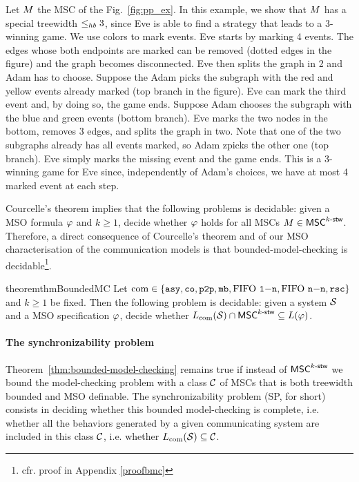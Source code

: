 \begin{example}
	Let $M$ the MSC of the Fig.~\ref{fig:pp_ex}. In this example, we show that $M$ has a special treewidth  $\leq_{hb} 3$, since Eve is able to find a strategy that leads to a 3-winning game.  We use colors to mark events. Eve starts by marking 4 events. The edges whose both endpoints are marked can be removed (dotted edges in the figure) and the graph becomes disconnected. Eve then splits the graph in 2 and Adam has to choose.
	Suppose the Adam picks the subgraph with the red and yellow events already marked (top branch in the figure). Eve can mark the third event and, by doing so, the game ends.
	Suppose Adam chooses the subgraph with the blue and green events (bottom branch). Eve marks the two nodes in the bottom, removes 3 edges, and splits the graph in two. Note that one of the two subgraphs already has all events marked, so Adam zpicks the other one (top branch).
	Eve simply marks the missing event and the game ends. This is a 3-winning game for Eve since, independently of Adam's choices, we have at most 4 marked event at each step.
\end{example}


Courcelle's theorem implies that the following problems is
decidable: given a MSO formula $\varphi$ and $k\geq 1$,
decide whether $\varphi$ holds for all MSCs $M\in\mathsf{MSC}^{k\textup{-}\mathsf{stw}}$.
Therefore, a direct consequence of Courcelle's theorem and of our MSO characterisation
of the communication models is that bounded-model-checking is decidable\footnote{cfr. proof in Appendix \ref{proofbmc}}.

\begin{restatable}{theorem}{thmBoundedMC}\label{thm:bounded-model-checking}
Let $\textup{com}\in\{\mathtt{asy}, \mathtt{co}, \mathtt{p2p}, \mathtt{mb}, \text{FIFO } \mathtt{1\mathsf{-}n}, \text{FIFO } \mathtt{n\mathsf{-}n}, \mathtt{rsc}\}$ and $k\geq 1$ be fixed.
Then the following problem is decidable: given a system $\mathcal{S}$ and
a MSO specification $\varphi$, decide whether
$L_{\textup{com}}(\mathcal{S})\cap \mathsf{MSC}^{k\textup{-}\mathsf{stw}}\subseteq L(\varphi)$.
\end{restatable}

\paragraph{\bf The synchronizability problem}

Theorem~\ref{thm:bounded-model-checking} remains true if instead of
$\mathsf{MSC}^{k\textup{-}\mathsf{stw}}$ we bound the model-checking problem with
a class $\mathcal{C}$ of MSCs that is both treewidth bounded and MSO definable.
The synchronizability problem (SP, for short) consists in deciding whether this bounded model-checking is complete,
i.e. whether all the behaviors generated by a given communicating system are included in this
class $\mathcal{C}$, i.e. whether
$L_{\textup{com}}(\mathcal{S}) \subseteq \mathcal{C}$.

